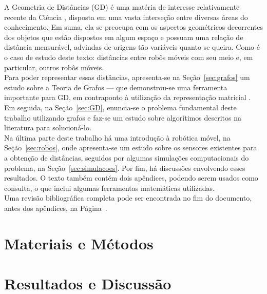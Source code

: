 \documentclass[a4paper,12pt]{report}
\begin{document}
	A Geometria de Distâncias (GD) é uma matéria de interesse relativamente recente da Ciência \cite{carlileGDandAplications}, disposta em uma vasta interseção entre diversas áreas do conhecimento. Em suma, ela se preocupa com os aspectos geométricos decorrentes dos objetos que estão dispostos em algum espaço e possuam uma relação de distância mensurável, advindas de origens tão variáveis quanto se queira. Como é o caso de estudo deste texto: distâncias entre robôs móveis com seu meio e, em particular, outros robôs móveis.
	\\
	
	Para poder representar essas distâncias, apresenta-se na Seção~\ref{sec:grafos} um estudo sobre a Teoria de Grafos --- que demonstrou-se uma ferramenta importante para GD, em contraponto à utilização da representação matricial \cite{carlileGDandAplications}. Em seguida, na Seção~\ref{sec:GD}, enuncia-se o problema fundamental deste trabalho utilizando grafos e faz-se um estudo sobre algorítimos descritos na literatura para solucioná-lo.
	\\
	
	Na última parte deste trabalho há uma introdução à robótica móvel, na Seção~\ref{sec:robos}, onde apresenta-se um estudo sobre os sensores existentes para a obtenção de distâncias, seguidos por algumas simulações computacionais do problema, na Seção~\ref{sec:simulacoes}. Por fim, há discussões envolvendo esses resultados. O texto também contém dois apêndices, podendo serem usados como consulta, o que inclui algumas ferramentas matemáticas utilizadas. 
	\\
	
	Uma revisão bibliográfica completa pode ser encontrada no fim do documento, antes dos apêndices, na Página~\pageref{sec:ref}.
	
	\newpage
	
	\chapter{Materiais e Métodos}
	
	
	
	\newpage
	
	

	\newpage
	\chapter{Resultados e Discussão \label{sec:disc}}
	
	
	
\end{document}
